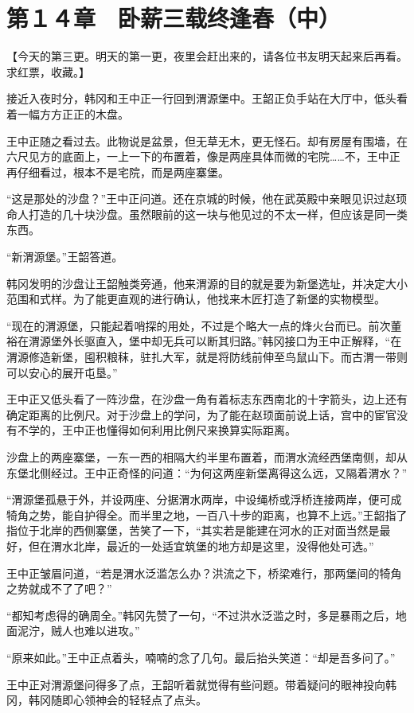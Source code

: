 \section{第１４章　卧薪三载终逢春（中）}

【今天的第三更。明天的第一更，夜里会赶出来的，请各位书友明天起来后再看。求红票，收藏。】

接近入夜时分，韩冈和王中正一行回到渭源堡中。王韶正负手站在大厅中，低头看着一幅方方正正的木盘。

王中正随之看过去。此物说是盆景，但无草无木，更无怪石。却有房屋有围墙，在六尺见方的底面上，一上一下的布置着，像是两座具体而微的宅院……不，王中正再仔细看过，根本不是宅院，而是两座寨堡。

“这是那处的沙盘？”王中正问道。还在京城的时候，他在武英殿中亲眼见识过赵顼命人打造的几十块沙盘。虽然眼前的这一块与他见过的不太一样，但应该是同一类东西。

“新渭源堡。”王韶答道。

韩冈发明的沙盘让王韶触类旁通，他来渭源的目的就是要为新堡选址，并决定大小范围和式样。为了能更直观的进行确认，他找来木匠打造了新堡的实物模型。

“现在的渭源堡，只能起着哨探的用处，不过是个略大一点的烽火台而已。前次董裕在渭源堡外长驱直入，堡中却无兵可以断其归路。”韩冈接口为王中正解释，“在渭源修造新堡，囤积粮秣，驻扎大军，就是将防线前伸至鸟鼠山下。而古渭一带则可以安心的展开屯垦。”

王中正又低头看了一阵沙盘，在沙盘一角有着标志东西南北的十字箭头，边上还有确定距离的比例尺。对于沙盘上的学问，为了能在赵顼面前说上话，宫中的宦官没有不学的，王中正也懂得如何利用比例尺来换算实际距离。

沙盘上的两座寨堡，一东一西的相隔大约半里布置着，而渭水流经西堡南侧，却从东堡北侧经过。王中正奇怪的问道：“为何这两座新堡离得这么远，又隔着渭水？”

“渭源堡孤悬于外，并设两座、分据渭水两岸，中设绳桥或浮桥连接两岸，便可成犄角之势，能自护得全。而半里之地，一百八十步的距离，也算不上远。”王韶指了指位于北岸的西侧寨堡，苦笑了一下，“其实若是能建在河水的正对面当然是最好，但在渭水北岸，最近的一处适宜筑堡的地方却是这里，没得他处可选。”

王中正皱眉问道，“若是渭水泛滥怎么办？洪流之下，桥梁难行，那两堡间的犄角之势就成不了了吧？”

“都知考虑得的确周全。”韩冈先赞了一句，“不过洪水泛滥之时，多是暴雨之后，地面泥泞，贼人也难以进攻。”

“原来如此。”王中正点着头，喃喃的念了几句。最后抬头笑道：“却是吾多问了。”

王中正对渭源堡问得多了点，王韶听着就觉得有些问题。带着疑问的眼神投向韩冈，韩冈随即心领神会的轻轻点了点头。

